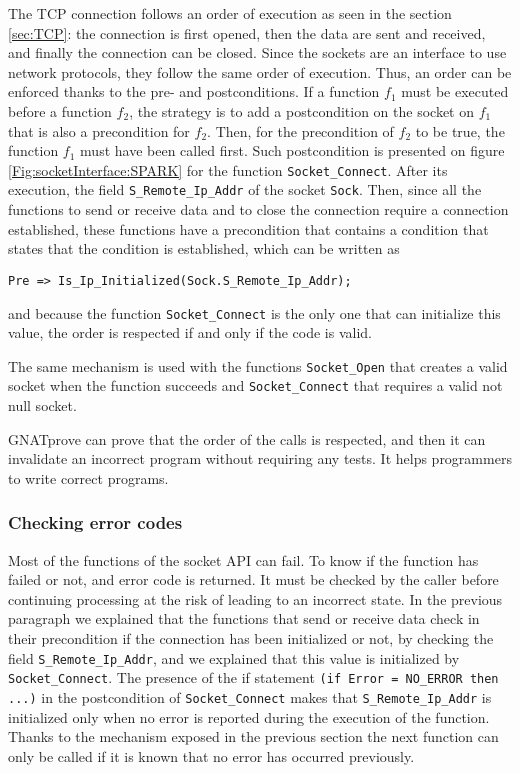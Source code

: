 \documentclass[runningheads]{llncs}
\begin{document}
    The TCP connection follows an order of execution as seen in the section \ref{sec:TCP}: the connection is first opened,
    then the data are sent and received, and finally the connection can be closed. Since the sockets are an interface to use
    network protocols, they follow the same order of execution. Thus, an order can be enforced thanks to the pre- and postconditions.
    If a function $f_1$ must be executed before a function $f_2$, the strategy is to add a postcondition on the socket on $f_1$
    that is also a precondition for $f_2$. Then, for the precondition of $f_2$ to be true, the function $f_1$ must have been called first.
    Such postcondition is presented on figure \ref{Fig:socketInterface:SPARK} for the function \lstinline[style=Spark]{Socket_Connect}. After its
    execution, the field \lstinline[style=Spark]{S_Remote_Ip_Addr} of the socket \lstinline[style=Spark]{Sock}. Then, since all the functions to send or receive
    data and to close the connection require a connection established, these functions have a precondition that contains a condition
    that states that the condition is established, which can be written as
    \begin{lstlisting}[style=Spark]
    Pre => Is_Ip_Initialized(Sock.S_Remote_Ip_Addr);
    \end{lstlisting}
    and because the function \lstinline{Socket_Connect} is the only one that can initialize this value, the order is respected
    if and only if the code is valid.

    The same mechanism is used with the functions \lstinline[style=Spark]{Socket_Open} that creates a valid socket when the function
    succeeds and \lstinline[style=Spark]{Socket_Connect} that requires a valid not null socket.

    GNATprove can prove that the order of the calls is respected, and then it can invalidate an incorrect program without requiring any
    tests. It helps programmers to write correct programs.


\subsubsection{Checking error codes}

    Most of the functions of the socket API can fail. To know if the function has failed or not, and error code is returned.
    It must be checked by the caller before continuing processing at the risk of leading to an incorrect state.
    In the previous paragraph we explained that the functions that send or receive data check in their precondition if the connection
    has been initialized or not, by checking the field \lstinline[style=Spark]{S_Remote_Ip_Addr}, and we explained that this value is initialized
    by \lstinline[style=Spark]{Socket_Connect}. The presence of the if statement \lstinline[style=Spark]{(if Error = NO_ERROR then ...)} in the postcondition
    of \lstinline[style=Spark]{Socket_Connect}  makes that \lstinline[style=Spark]{S_Remote_Ip_Addr} is initialized only when no error is reported during
    the execution of the function. Thanks to the mechanism exposed in the previous section the next function can only be called
    if it is known that no error has occurred previously.
\end{document}
